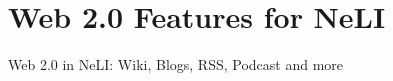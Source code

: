 \documentclass{beamer}
\begin{document}
\section{Web 2.0 Features for NeLI}
\begin{frame}[t]{Web 2.0 in NeLI: Wiki, Blogs, RSS, Podcast and more}
\vspace*{-0.25cm}


\end{frame}
\end{document}
